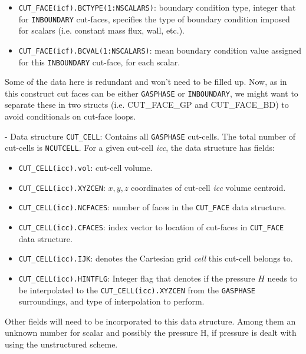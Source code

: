 \documentclass[12pt]{article}
\begin{document}
\begin{itemize}
  \item \texttt{CUT\_FACE(icf).BCTYPE(1:NSCALARS)}: boundary condition type, integer that for \texttt{INBOUNDARY} cut-faces, specifies the type of boundary condition imposed for scalars (i.e. constant mass flux, wall, etc.).

  \item \texttt{CUT\_FACE(icf).BCVAL(1:NSCALARS)}: mean boundary condition value assigned for this \texttt{INBOUNDARY} cut-face, for each scalar.

\end{itemize}
%
Some of the data here is redundant and won't need to be filled up. Now, as in this construct cut faces can be either \texttt{GASPHASE} or \texttt{INBOUNDARY}, we might want to separate these in two structs (i.e. CUT\_FACE\_GP and CUT\_FACE\_BD) to avoid conditionals on cut-face loops.


- Data structure \texttt{CUT\_CELL}: Contains all \texttt{GASPHASE} cut-cells. The total number of cut-cells is \texttt{NCUTCELL}. For a given cut-cell \textit{icc}, the data structure has fields:
%
\begin{itemize}

  \item \texttt{CUT\_CELL(icc).vol}: cut-cell volume.

  \item \texttt{CUT\_CELL(icc).XYZCEN}:  $x,y,z$ coordinates of cut-cell \textit{icc} volume centroid.

  \item \texttt{CUT\_CELL(icc).NCFACES}: number of faces in the \texttt{CUT\_FACE} data structure.

  \item \texttt{CUT\_CELL(icc).CFACES}: index vector to location of cut-faces in \texttt{CUT\_FACE} data structure.

  \item \texttt{CUT\_CELL(icc).IJK}: denotes the Cartesian grid \textit{cell} this cut-cell belongs to.

  \item \texttt{CUT\_CELL(icc).HINTFLG}: Integer flag that denotes if the pressure $H$ needs to be interpolated to the \texttt{CUT\_CELL(icc).XYZCEN} from the \texttt{GASPHASE} surroundings, and type of interpolation to perform.

\end{itemize}
%
Other fields will need to be incorporated to this data structure. Among them an unknown number for scalar and possibly the pressure H, if pressure is dealt with using the unstructured scheme.
\end{document}
